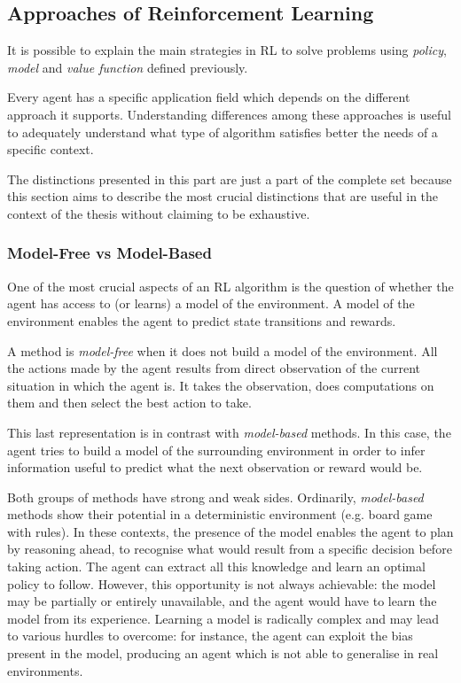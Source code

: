 \subsection{Approaches of Reinforcement Learning}

It is possible to explain the main strategies in RL to solve problems using \textit{policy}, \textit{model} and \textit{value function} defined previously.

Every agent has a specific application field which depends on the different approach it supports.
Understanding differences among these approaches is useful to adequately understand what type of algorithm satisfies better the needs of a specific context.

The distinctions presented in this part are just a part of the complete set because this section aims to describe the most crucial distinctions that are useful in the context of the thesis without claiming to be exhaustive.

\subsubsection{Model-Free vs Model-Based}

One of the most crucial aspects of an RL algorithm is the question of whether the agent has access to (or learns) a model of the environment. A model of the environment enables the agent to predict state transitions and rewards.

A method is \textit{model-free} when it does not build a model of the environment. All the actions made by the agent results from direct observation of the current situation in which the agent is. It takes the observation, does computations on them and then select the best action to take.

This last representation is in contrast with \textit{model-based} methods. In this case, the agent tries to build a model of the surrounding environment in order to infer information useful to predict what the next observation or reward would be.

Both groups of methods have strong and weak sides.
Ordinarily, \textit{model-based} methods show their potential in a deterministic environment (e.g. board game with rules). In these contexts, the presence of the model enables the agent to plan by reasoning ahead, to recognise what would result from a specific decision before taking action. The agent can extract all this knowledge and learn an optimal policy to follow. However, this opportunity is not always achievable: the model may be partially or entirely unavailable, and the agent would have to learn the model from its experience. Learning a model is radically complex and may lead to various hurdles to overcome: for instance, the agent can exploit the bias present in the model, producing an agent which is not able to generalise in real environments.

